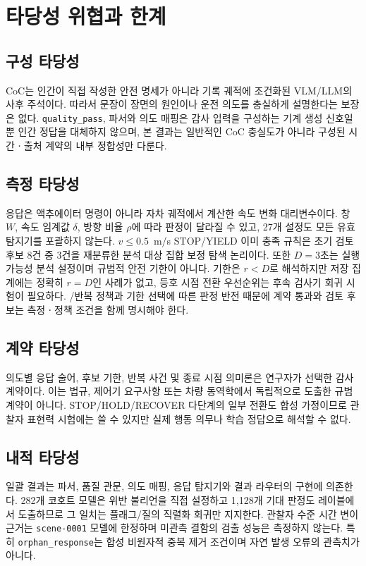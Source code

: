 \section{타당성 위협과 한계}
\label{sec:threats}

\subsection{구성 타당성}
CoC는 인간이 직접 작성한 안전 명세가 아니라 기록 궤적에 조건화된 VLM/LLM의 사후 주석이다. 따라서 문장이 장면의 원인이나 운전 의도를 충실하게 설명한다는 보장은 없다. \texttt{quality\_pass}, 파서와 의도 매핑은 감사 입력을 구성하는 기계 생성 신호일 뿐 인간 정답을 대체하지 않으며, 본 결과는 일반적인 CoC 충실도가 아니라 구성된 시간ㆍ출처 계약의 내부 정합성만 다룬다.

\subsection{측정 타당성}
응답은 액추에이터 명령이 아니라 자차 궤적에서 계산한 속도 변화 대리변수이다. 창 $W$, 속도 임계값 $\delta$, 방향 비율 $\rho$에 따라 판정이 달라질 수 있고, 27개 설정도 모든 유효 탐지기를 포괄하지 않는다. $v\leq0.5$~m/s STOP/YIELD 이미 충족 규칙은 초기 검토 후보 8건 중 3건을 재분류한 분석 대상 집합 보정 탐색 논리이다. 또한 $D=3$초는 실행 가능성 분석 설정이며 규범적 안전 기한이 아니다. 기한은 $r<D$로 해석하지만 저장 집계에는 정확히 $r=D$인 사례가 없고, 등호 시점 전환 우선순위는 후속 검사기 회귀 시험이 필요하다. \preserve/\reset 반복 정책과 기한 선택에 따른 판정 반전 때문에 계약 통과와 검토 후보는 측정ㆍ정책 조건을 함께 명시해야 한다.

\subsection{계약 타당성}
의도별 응답 술어, 후보 기한, 반복 사건 및 종료 시점 의미론은 연구자가 선택한 감사 계약이다. 이는 법규, 제어기 요구사항 또는 차량 동역학에서 독립적으로 도출한 규범 계약이 아니다. STOP/HOLD/RECOVER 다단계의 일부 전환도 합성 가정이므로 관찰자 표현력 시험에는 쓸 수 있지만 실제 행동 의무나 학습 정답으로 해석할 수 없다.

\subsection{내적 타당성}
일괄 결과는 파서, 품질 관문, 의도 매핑, 응답 탐지기와 결과 라우터의 구현에 의존한다. 282개 코호트 모델은 위반 불리언을 직접 설정하고 1,128개 기대 판정도 레이블에서 도출하므로 그 일치는 플래그/질의 직렬화 회귀만 지지한다. 관찰자 수준 시간 변이 근거는 \texttt{scene-0001} 모델에 한정하며 미관측 결함의 검출 성능은 측정하지 않는다. 특히 \texttt{orphan\_response}는 합성 비원자적 중복 제거 조건이며 자연 발생 오류의 관측치가 아니다.


